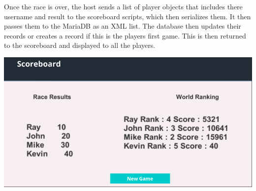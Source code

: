 Once the race is over, the host sends a list of player objects that includes there username and result to the scoreboard scripts, which then serializes them. It then passes them to the MariaDB as an XML list. The database then updates their  records or creates a record if this is the players first game. This is then returned to the scoreboard and displayed to all the players.
\newline 

\includegraphics[width=1\columnwidth]{img/results.PNG}